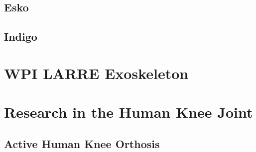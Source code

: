 \subsection{Esko}

\subsection{Indigo}

\section{WPI LARRE Exoskeleton}

\section{Research in the Human Knee Joint}

\subsection{Active Human Knee Orthosis}